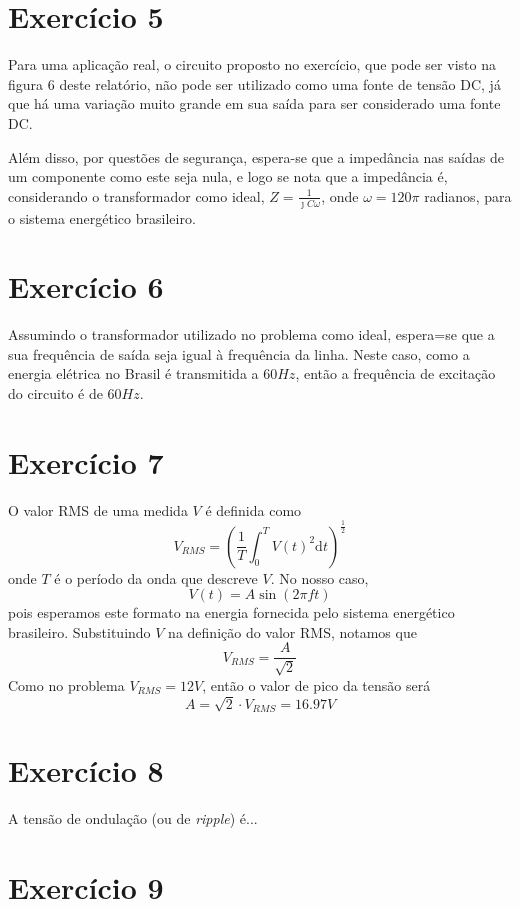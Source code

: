 \documentclass[12pt, a4paper, twoside]{article}
\begin{document}

\section{Exercício 5}

Para uma aplicação real, o circuito proposto no exercício, que pode ser visto na figura 6 deste relatório, não pode ser utilizado como uma fonte de tensão DC, já que há uma variação muito grande em sua saída para ser considerado uma fonte DC.

Além disso, por questões de segurança, espera-se que a impedância nas saídas de um componente como este seja nula, e logo se nota que a impedância é, considerando o transformador como ideal, $Z = \frac{1}{\jmath C \omega}$, onde $\omega = 120 \pi$ radianos, para o sistema energético brasileiro.

\section{Exercício 6}

Assumindo o transformador utilizado no problema como ideal, espera=se que a sua frequência de saída seja igual à frequência da linha. Neste caso, como a energia elétrica no Brasil é transmitida a $60Hz$, então a frequência de excitação do circuito é de $60Hz$.

\section{Exercício 7}

O valor RMS de uma medida $V$ é definida como
$$ V_{RMS} = \left( \frac{1}{T} \int_0^T V(t)^2 \mathrm{d}t \right)^{\frac{1}{2}} $$
onde $T$ é o período da onda que descreve $V$. No nosso caso,
$$ V(t) = A \sin(2 \pi f t) $$
pois esperamos este formato na energia fornecida pelo sistema energético brasileiro. Substituindo $V$ na definição do valor RMS, notamos que
$$ V_{RMS} = \frac{A}{\sqrt{2}} $$
Como no problema $V_{RMS} = 12V$, então o valor de pico da tensão será
$$ A = \sqrt{2} \cdot V_{RMS} = 16.97V $$

\section{Exercício 8}

A tensão de ondulação (ou de \textit{ripple}) é...

\section{Exercício 9}
\end{document}
